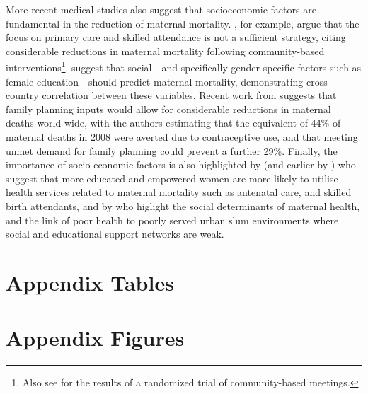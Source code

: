\documentclass{article}[12pt,subeqn]
\newcommand{\MMRfolder}{"."}
\begin{document}
\begin{spacing}{1.4}
More recent medical studies also suggest that socioeconomic factors are 
fundamental in the reduction of maternal mortality.  \citet{Costelloetal2004}, 
for example, argue that the focus on primary care and skilled attendance is 
not a sufficient strategy, citing considerable reductions in maternal mortality 
following community-based interventions\footnote{Also see 
\citet{Manandharetal2004} for the results of a randomized trial of 
community-based meetings.}.  \citet{McAlisterBaskett2006} suggest that 
social---and specifically gender-specific factors such as female 
education---should predict maternal mortality, demonstrating cross-country 
correlation between these variables. Recent work from \citet{Ahmedetal2012} 
suggests that family planning inputs would allow for considerable reductions in 
maternal deaths world-wide, with the authors estimating that the equivalent of 
44\% of maternal deaths in 2008 were averted due to contraceptive use, and that 
meeting unmet demand for family planning could prevent a further 29\%. Finally, 
the importance of socio-economic factors is also highlighted by 
\citet{Ahmedetal2010} (and earlier by \citet{ShenWilliamson1999}) who suggest 
that more educated and empowered women are more likely to utilise health 
services related to maternal mortality such as antenatal care, and skilled 
birth attendants, and by \citet{BhuttaBlack2013} who higlight the social 
determinants of maternal health, and the link of poor health to poorly served 
urban slum environments where social and educational support networks are weak.

\newpage
\section{Appendix Tables}
\label{scn:appTables}


\newpage
\section{Appendix Figures}
\label{scn:appFigures}

%

\end{spacing}
\end{document}
